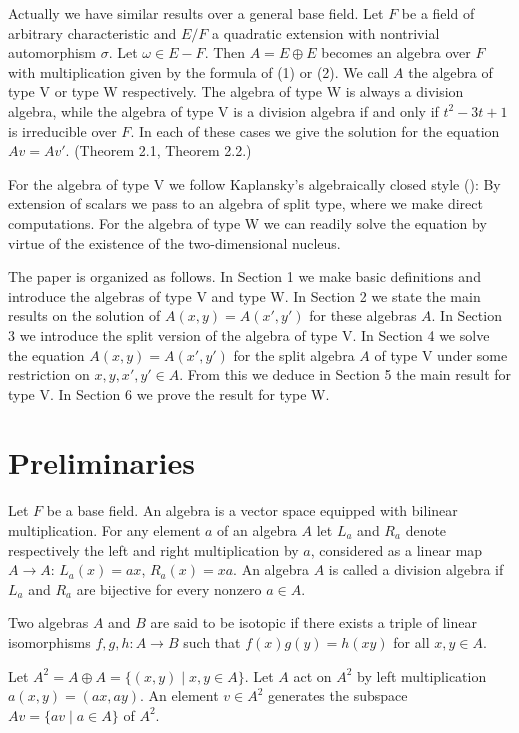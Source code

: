 \documentclass{article}
\begin{document}
\medskip
Actually we have similar results over a general base field.
Let $F$ be a field of arbitrary characteristic and $E/F$ a quadratic extension with nontrivial automorphism $\sigma$. Let $\omega\in E-F$.
Then $A=E\oplus E$ becomes an algebra over $F$ with multiplication given by the formula of (1) or (2).
We call $A$ the algebra of type V or type W respectively.
The algebra of type W is always a division algebra, while
the algebra of type V is a division algebra if and only if $t^2-3t+1$ is irreducible over $F$.
In each of these cases we give the solution for the equation $Av=Av'$. 
(Theorem 2.1, Theorem  2.2.)

For the algebra of type V we follow Kaplansky's  algebraically closed style (\cite{Kap}):
By extension of scalars we pass to an algebra of split type, where we make direct computations. For the algebra of type W we can readily solve the equation by virtue of the existence of the two-dimensional nucleus.

The paper is organized as follows.
In Section 1 we make basic definitions and introduce the algebras of type V and type W.
In Section 2 we state the main results on the solution of $A(x,y)=A(x',y')$ for these algebras $A$.
In Section 3 we introduce the split version of the algebra of type V.
In Section 4 we solve the equation $A(x,y)=A(x',y')$ for the split algebra $A$ of  type V under some restriction on $x,y,x',y'\in A$.
From this 
we deduce in Section 5 the main result for type V.
In Section 6 we prove the result for type W.




\section{Preliminaries}

Let $F$  be a base field. 
An algebra is a vector space equipped with bilinear multiplication.
For any element $a$ of an algebra $A$ let $L_a$ and $R_a$ denote respectively the left and right multiplication by $a$, considered as a linear map $A\to A$: $L_a(x)=ax$, $R_a(x)= xa$.
An algebra $A$ is called a division algebra if $L_a$ and $R_a$ are bijective for every nonzero $a\in A$.

Two algebras $A$ and $B$ are said to be isotopic if there exists a triple of  linear isomorphisms
$f,g,h\colon A\to B$ such that $f(x)g(y)=h(xy)$ for all $x,y\in A$.

Let $A^2=A\oplus A=\{(x,y)\mid x,y\in A\}$.
Let $A$ act on $A^2$ by left multiplication
$a(x,y)=(ax,ay)$.
An element $v\in A^2$ generates the subspace $Av=\{av\mid a\in A\}$ of $A^2$.
\end{document}
